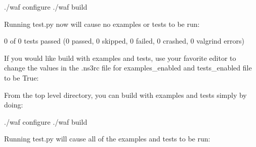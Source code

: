 \documentclass[letterpaper,10pt,english]{sphinxmanual}
\begin{document}
\begin{sphinxVerbatim}[commandchars=\\\{\}]
\PYGZdl{} ./waf configure
\PYGZdl{} ./waf build
\end{sphinxVerbatim}

Running test.py now will cause no examples or tests to be run:

\begin{sphinxVerbatim}[commandchars=\\\{\}]
0 of 0 tests passed (0 passed, 0 skipped, 0 failed, 0 crashed, 0 valgrind errors)
\end{sphinxVerbatim}

If you would like build  with examples and tests, use your
favorite editor to change the values in the .ns3rc file for
examples\_enabled and tests\_enabled file to be True:

\begin{sphinxVerbatim}[commandchars=\\\{\}]

  \PYG{p}{[}\PYG{p}{]}

  

  
\end{sphinxVerbatim}

From the top level  directory, you can build  with examples
and tests simply by doing:

\begin{sphinxVerbatim}[commandchars=\\\{\}]
\PYGZdl{} ./waf configure
\PYGZdl{} ./waf build
\end{sphinxVerbatim}

Running test.py will cause all of the examples and tests to be run:
\end{document}
